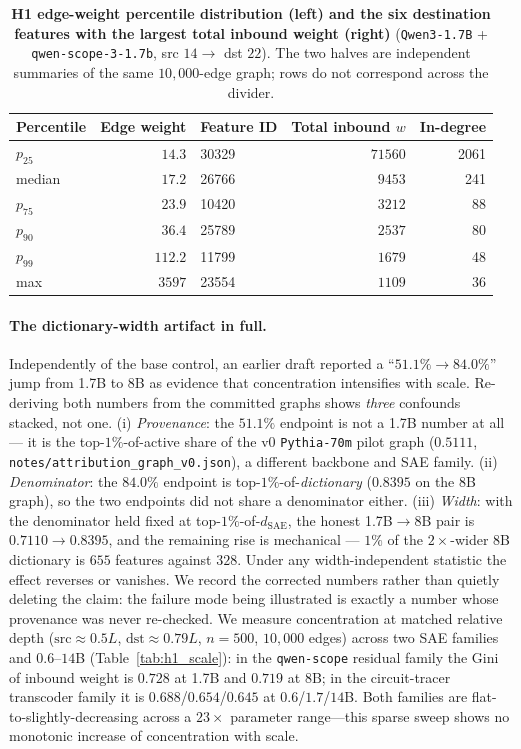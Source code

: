 \documentclass{article}
\begin{document}
\begin{table}[h]
\centering
\caption{\textbf{H1 edge-weight percentile distribution (left) and the six destination features with the largest total inbound weight (right)} (\texttt{Qwen3-1.7B} + \texttt{qwen-scope-3-1.7b}, src $14\to$ dst $22$). The two halves are independent summaries of the same $10{,}000$-edge graph; rows do not correspond across the divider.}
\label{tab:h1_weights}
\small
\begin{tabular}{lr|lrr}
\toprule
Percentile & Edge weight & Feature ID & Total inbound $w$ & In-degree \\
\midrule
$p_{25}$ & $14.3$ & 30329 & $71560$ & 2061 \\
median & $17.2$ & 26766 & $9453$ & 241 \\
$p_{75}$ & $23.9$ & 10420 & $3212$ & 88 \\
$p_{90}$ & $36.4$ & 25789 & $2537$ & 80 \\
$p_{99}$ & $112.2$ & 11799 & $1679$ & 48 \\
max & $3597$ & 23554 & $1109$ & 36 \\
\bottomrule
\end{tabular}
\end{table}

\paragraph{The dictionary-width artifact in full.} Independently of the base control, an earlier draft reported a ``$51.1\%\to84.0\%$'' jump from 1.7B to 8B as evidence that concentration intensifies with scale. Re-deriving both numbers from the committed graphs shows \emph{three} confounds stacked, not one. (i) \emph{Provenance}: the $51.1\%$ endpoint is not a 1.7B number at all --- it is the top-$1\%$-of-active share of the v0 \texttt{Pythia-70m} pilot graph ($0.5111$, \texttt{notes/attribution\_graph\_v0.json}), a different backbone and SAE family. (ii) \emph{Denominator}: the $84.0\%$ endpoint is top-$1\%$-of-\emph{dictionary} ($0.8395$ on the 8B graph), so the two endpoints did not share a denominator either. (iii) \emph{Width}: with the denominator held fixed at top-$1\%$-of-$d_{\text{SAE}}$, the honest 1.7B$\to$8B pair is $0.7110\to0.8395$, and the remaining rise is mechanical --- $1\%$ of the $2\times$-wider 8B dictionary is $655$ features against $328$. Under any width-independent statistic the effect reverses or vanishes. We record the corrected numbers rather than quietly deleting the claim: the failure mode being illustrated is exactly a number whose provenance was never re-checked. We measure concentration at matched relative depth ($\text{src}\approx0.5L$, $\text{dst}\approx0.79L$, $n{=}500$, $10{,}000$ edges) across two SAE families and $0.6$--$14$B (Table~\ref{tab:h1_scale}): in the \texttt{qwen-scope} residual family the Gini of inbound weight is $0.728$ at 1.7B and $0.719$ at 8B; in the circuit-tracer transcoder family it is $0.688$/$0.654$/$0.645$ at $0.6$/$1.7$/$14$B. Both families are flat-to-slightly-decreasing across a $23\times$ parameter range---this sparse sweep shows no monotonic increase of concentration with scale.
\end{document}
